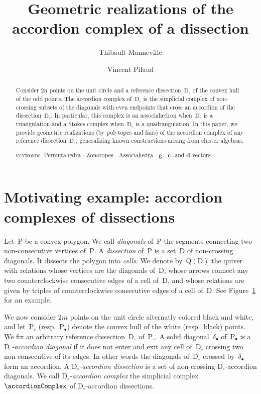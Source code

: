 \documentclass{amsart}
\title[Geometric realizations of the accordion complex of a dissection]{Geometric realizations of the \\ accordion complex of a dissection}
\author{Thibault Manneville}
\author{Vincent Pilaud}
\theoremstyle{definition}
\renewcommand{\b}[1]{\mathbf{#1}} %
\newcommand{\fref}[1]{Figure~\ref{#1}} %
\newcommand{\darkblue}{\color{darkblue}} %
\newcommand{\defn}[1]{\textsl{\darkblue #1}} %
\newcommand{\polygon}{\mathrm{P}} %
\newcommand{\dissection}{\mathrm{D}} %
\newcommand{\quiver}{\mathrm{Q}} %
\begin{document}
\begin{abstract}
Consider $2n$ points on the unit circle and a reference dissection~$\dissection_\circ$ of the convex hull of the odd points. The accordion complex of~$\dissection_\circ$ is the simplicial complex of non-crossing subsets of the diagonals with even endpoints that cross an accordion of the dissection~$\dissection_\circ$. In particular, this complex is an associahedron when~$\dissection_\circ$ is a triangulation and a Stokes complex when~$\dissection_\circ$ is a quadrangulation. In this paper, we provide geometric realizations (by polytopes and fans) of the accordion complex of any reference dissection~$\dissection_\circ$, generalizing known constructions arising from cluster algebras.

\medskip
\noindent
\textsc{keywords.} Permutahedra $\cdot$ Zonotopes $\cdot$ Associahedra $\cdot$ $\b{g}$-, $\b{c}$- and $\b{d}$-vectors.
\end{abstract}

\vspace*{-1cm}



\section{Motivating example: accordion complexes of dissections}

Let~$\polygon$ be a convex polygon.
We call \defn{diagonals} of~$\polygon$ the segments connecting two non-consecutive vertices of~$\polygon$.
A \defn{dissection} of~$\polygon$ is a set~$\dissection$ of non-crossing diagonals.
It dissects the polygon into \defn{cells}.
We denote by~$\quiver(\dissection)$ the quiver with relations whose vertices are the diagonals of~$\dissection$, whose arrows connect any two counterclockwise consecutive edges of a cell of~$\dissection$, and whose relations are given by triples of counterclockwise consecutive edges of a cell of~$\dissection$.
See \fref{} for an example.

We now consider $2m$ points on the unit circle alternatly colored black and white, and let~$\polygon_\circ$ (resp.~$\polygon_\bullet$) denote the convex hull of the white (resp.~black) points.
We fix an arbitrary reference dissection~$\dissection_\circ$ of~$\polygon_\circ$.
A solid diagonal~$\delta_\bullet$ of~$\polygon_\bullet$ is a \defn{$\dissection_\circ$-accordion diagonal} if it does not enter and exit any cell of~$\dissection_\circ$ crossing two non-consecutive of its edges.
In other words the diagonals of~$\dissection_\circ$ crossed by~$\delta_\bullet$ form an accordion.
A \defn{$\dissection_\circ$-accordion dissection} is a set of non-crossing $\dissection_\circ$-accordion diagonals. We call \defn{$\dissection_\circ$-accordion complex} the simplicial complex~$\accordionComplex$ of $\dissection_\circ$-accordion dissections.
\end{document}
